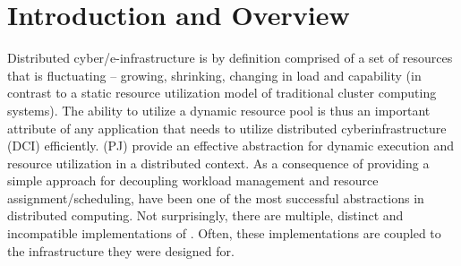 \documentclass{sig-alternate}
\begin{document}



\upp
\section{Introduction and Overview} 

Distributed cyber/e-infrastructure is by definition comprised of a set
of resources that is fluctuating -- growing, shrinking, changing in
load and capability (in contrast to a static resource utilization
model of traditional cluster computing systems).  The
ability to utilize a dynamic resource pool is thus an important
attribute of any application that needs to utilize distributed
cyberinfrastructure (DCI) efficiently. \pilotjobs (PJ) provide an
effective abstraction for dynamic execution and resource utilization
in a distributed context. As a consequence of providing a simple
approach for decoupling workload management and resource
assignment/scheduling, \pilotjobs have been one of the most successful
abstractions in distributed computing.  Not surprisingly, there are
multiple, distinct and incompatible implementations of
\pilotjobs. Often, these implementations are coupled to the
infrastructure they were designed for.

\end{document}
